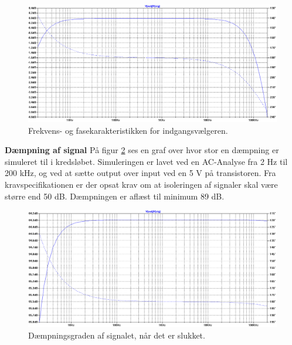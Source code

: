 \begin{figure}[h]
\centering
\includegraphics[scale=0.3]{teknisk/indgangsvaelger/simulering/frekvenskarakteristik.png}
\caption{Frekvens- og fasekarakteristikken for indgangsvælgeren.}
\label{indgangsvaelger_frekvenskarakteristik}
\end{figure}

\textbf{Dæmpning af signal}
\newline
På figur \ref{indgangsvaelger_daempniing} ses en graf over hvor stor en dæmpning er simuleret til i kredsløbet. Simuleringen er lavet ved en AC-Analyse fra 2 Hz til 200 kHz, og ved at sætte output over input ved en 5 V på transistoren. Fra kravspecifikationen er der opsat krav om at isoleringen af signaler skal være større end 50 dB. Dæmpningen er aflæst til minimum 89 dB.
\begin{figure}[h]
\centering
\includegraphics[scale=0.3]{teknisk/indgangsvaelger/simulering/daempning_af_signal.png}
\caption{Dæmpningsgraden af signalet, når det er slukket.}
\label{indgangsvaelger_daempniing}
\end{figure}

